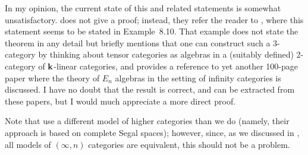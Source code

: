 \begin{remark}
  In my opinion, the current state of this and related statements is somewhat
  unsatisfactory. \cite[Theorem 2.2.18]{dsps-dualizable} does not give a
  proof; instead, they refer the reader to \cite{jfs}, where this statement
  seems to be stated in Example~8.10. That example does not state the theorem in
  any detail but briefly mentions that one can construct such a 3-category by
  thinking about tensor categories as algebras in a (suitably defined)
  2-category of $\mathbf{k}$-linear categories, and provides a reference to yet another
  100-page paper where the theory of $E_n$ algebras in the setting of infinity
  categories is discussed. I have no doubt that the result is correct, and
  can be extracted from these papers, but I would much appreciate a
  more direct proof.
\end{remark}


Note that \cite{jfs} use a different model of higher categories than we do
(namely, their approach is based on complete Segal spaces); however, since, as
we discussed in , all models of $(\infty,n)$ categories are equivalent,
this should not be a problem.
